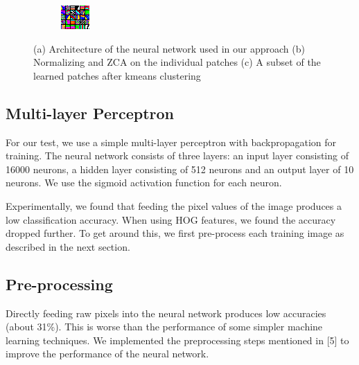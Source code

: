\documentclass{article} %
\begin{document}
\begin{figure}
\begin{subfigure}{.1\linewidth}
            \centering
            \includegraphics[width=\linewidth]{images/patch-clusters-few.png}
        \caption{}
        \end{subfigure}
        \caption{(a) Architecture of the neural network used in our approach (b) Normalizing and ZCA on the individual patches (c) A subset of the learned patches after kmeans clustering}
    \end{figure}
 

    \subsection{Multi-layer Perceptron} %
    \label{sub:Multi-layer Perceptron}
        For our test, we use a simple multi-layer perceptron with backpropagation for training. The neural network consists of three layers: an input layer consisting of 16000 neurons, a hidden layer consisting of 512 neurons and an output layer of 10 neurons. We use the sigmoid activation function for each neuron.

        Experimentally, we found that feeding the pixel values of the image produces a low classification accuracy. When using HOG features, we found the accuracy dropped further. To get around this, we first pre-process each training image as described in the next section.

    \subsection{Pre-processing} %
    \label{sub:Pre-processing}
        Directly feeding raw pixels into the neural network produces low accuracies (about 31\%). This is worse than the performance of some simpler machine learning techniques. We implemented the preprocessing steps mentioned in [5] to improve the performance of the neural network. 
\end{document}

